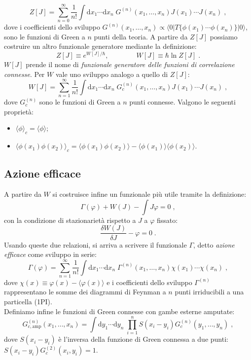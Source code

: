 \documentclass[12pt,a4paper]{article}
\theoremstyle{definition}
\numberwithin{equation}{section}
\newcommand{\diff}[1][]{\mathrm{d}#1}
\newcommand{\bra}{\langle}
\newcommand{\ket}{\rangle}
\begin{document}
\begin{equation}
Z[J]=\sum_{n=0}^{\infty}\frac{1}{n!}\int\diff{x_1}\cdots\diff{x_n}\;G^{(n)}(x_1,\ldots,x_n)J(x_1)\cdots J(x_n)\;,
\end{equation}
dove i coefficienti dello sviluppo $G^{(n)}(x_1,\ldots,x_n)\propto \bra 0|T\{\phi(x_1)\cdots\phi(x_n)\}|0\ket$, sono le funzioni di Green a $n$ punti della teoria. A partire da $Z[J]$ possiamo costruire un altro funzionale generatore mediante la definizione:
\begin{equation}
\boxed{
Z[J]\equiv e^{W[J]/\hbar},\qquad\qquad W[J]\equiv\hbar\ln Z[J]
}\;.
\end{equation}
$W[J]$ prende il nome di \emph{funzionale generatore delle funzioni di correlazione connesse}. Per $W$ vale uno sviluppo analogo a quello di $Z[J]$:
\begin{equation}
W[J]=\sum_{n=1}^{\infty}\frac{1}{n!}\int\diff{x_1}\cdots\diff{x_n}\; G_c^{(n)}(x_1,\ldots,x_n)J(x_1)\cdots J(x_n)\;,
\end{equation}
dove $G_c^{(n)}$ sono le funzioni di Green a $n$ punti connesse. Valgono le seguenti proprietà:
\begin{itemize}
\item $\bra \phi\ket_c=\bra \phi\ket$;
\item $\bra \phi(x_1)\phi(x_2)\ket_c=\bra\phi(x_1)\phi(x_2)\ket-\bra\phi(x_1)\ket\bra\phi(x_2)\ket$.
\end{itemize}
\subsection{Azione efficace}
A partire da $W$ si costruisce infine un funzionale più utile tramite la definizione:
\begin{equation}
\Gamma(\varphi)+W(J)-\int J\varphi =0\;,
\end{equation}
con la condizione di stazionarietà rispetto a $J$ a $\varphi$ fissato:
\begin{equation}
\frac{\delta W(J)}{\delta J}-\varphi=0\;.
\end{equation}
Usando queste due relazioni, si arriva a scrivere il funzionale $\Gamma$, detto \emph{azione efficace} come sviluppo in serie:
\begin{equation}
\Gamma(\varphi)=\sum_{n=1}^{\infty}\frac{1}{n!}\int\diff{x_1}\cdots\diff{x_n}\;\Gamma^{(n)}(x_1,\ldots,x_n)\chi(x_1)\cdots\chi(x_n)\;,
\end{equation}
dove $\chi(x)\equiv \varphi(x)-\bra\varphi(x)\ket$ e i coefficienti dello sviluppo $\Gamma^{(n)}$ rappresentano le somme dei diagrammi di Feynman a $n$ punti irriducibili a una particella (1PI). \\
Definiamo infine le funzioni di Green connesse con gambe esterne amputate:
\begin{equation}
G_{c,\mathrm{amp}}^{(n)}(x_1,\ldots,x_n)=\int\diff{y_1}\cdots\diff{y_n}\;\prod_{i=1}^nS(x_i-y_i)G_c^{(n)}(y_1,\ldots,y_n)\;,
\end{equation}
dove $S(x_i-y_i)$ è l'inversa della funzione di Green connessa a due punti: $S(x_i-y_i)G_c^{(2)}(x_i,y_i)=1$.
\end{document}
